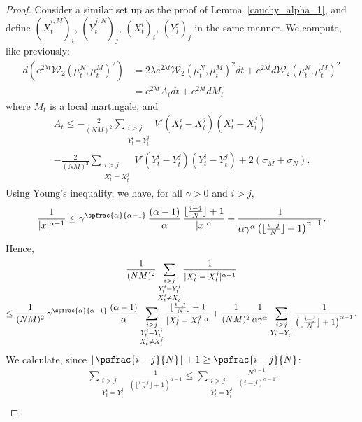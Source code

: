 \begin{proof}
Consider a similar set up as the proof of Lemma~\ref{cauchy_alpha_1}, and define $(\tilde{X}^{i,M}_t)_i$, $(\tilde{Y}^{j,N}_t)_j$, $(X^{i}_t)_i$, $(Y^{j}_t)_j$ in the same manner. We compute, like previously:
\begin{align*}
d\left(e^{2\lambda t}\mathcal{W}_2\left(\mu_t^N,\mu_t^M\right)^2\right)&=2\lambda e^{2\lambda t}\mathcal{W}_2\left(\mu_t^N,\mu_t^M\right)^2dt+e^{2\lambda t}d\mathcal{W}_2\left(\mu_t^N,\mu_t^M\right)^2\\
&=e^{2\lambda t}A_tdt+e^{2\lambda t}dM_t
\end{align*}
where $M_t$ is a local martingale, and\vspace*{-3pt}
\begin{multline*}
A_t\leq -\frac{2}{(NM)^2}\sum_{\substack{i>j\\Y^i_t= Y^j_t}}V'(X^i_t-X^j_t)(X^i_t-X^j_t)\\[-15pt]
-\frac{2}{(NM)^2}\sum_{\substack{i>j\\X^i_t= X^j_t}}V'(Y^i_t-Y^j_t)(Y^i_t-Y^j_t)+2(\sigma_M+\sigma_N).
\end{multline*}
Using Young's inequality, we have, for all $\gamma>0$ and $i>j$,\vspace*{-3pt}
\[
\frac{1}{|x|^{\alpha-1}}\leq\gamma^{\spfrac{\alpha}{\alpha-1}}\,\frac{(\alpha-1)}{\alpha}\,\frac{\lfloor\frac{i-j}{N}\rfloor+1}{|x|^{\alpha}}+\frac{1}{\alpha\gamma^\alpha\left(\lfloor\frac{i-j}{N}\rfloor+1\right)^{\alpha-1}}.\vspace*{-3pt}
\]
Hence,\vspace*{-5pt}
\begin{multline*}
\frac{1}{(NM)^2}\sum_{\substack{i>j\\Y^i_t= Y^j_t\\X^i_t\neq X^j_t}}\frac{1}{|X^i_t-X^j_t|^{\alpha-1}}\\[-5pt]
\leq \frac{1}{(NM)^2}\,\gamma^{\spfrac{\alpha}{\alpha-1}}\,\frac{(\alpha-1)}{\alpha}\sum_{\substack{i>j\\Y^i_t= Y^j_t\\X^i_t\neq X^j_t}}\frac{\lfloor\frac{i-j}{N}\rfloor+1}{|X^i_t-X^j_t|^{\alpha}}
+\frac{1}{(NM)^2}\frac{1}{\alpha\gamma^\alpha}\sum_{\substack{i>j\\Y^i_t= Y^j_t}}\frac{1}{\left(\lfloor\frac{i-j}{N}\rfloor+1\right)^{\alpha-1}}.
\end{multline*}
We calculate, since $\lfloor\psfrac{i-j}{N}\rfloor+1\geq\psfrac{i-j}{N}$:
\begin{gather*}
\sum_{\substack{i>j\\Y^i_t= Y^j_t}}\frac{1}{\left(\lfloor\frac{i-j}{N}\rfloor+1\right)^{\alpha-1}}\leq\sum_{\substack{i>j\\Y^i_t= Y^j_t}}\frac{N^{\alpha-1}}{\left( i-j\right)^{\alpha-1}}\\[-10pt]

\end{gather*}
\end{proof}
